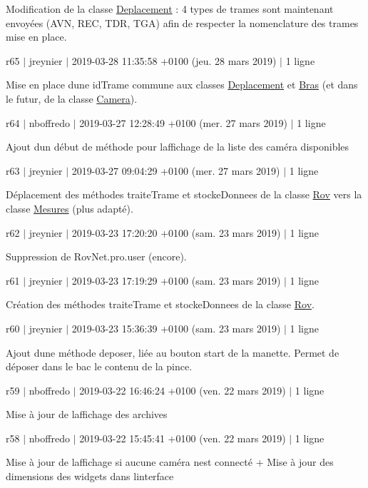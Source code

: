 Modification de la classe \hyperlink{class_deplacement}{Deplacement} \+: 4 types de trames sont maintenant envoyées (A\+VN, R\+EC, T\+DR, T\+GA) afin de respecter la nomenclature des trames mise en place.

r65 $\vert$ jreynier $\vert$ 2019-\/03-\/28 11\+:35\+:58 +0100 (jeu. 28 mars 2019) $\vert$ 1 ligne

Mise en place d\textquotesingle{}une id\+Trame commune aux classes \hyperlink{class_deplacement}{Deplacement} et \hyperlink{class_bras}{Bras} (et dans le futur, de la classe \hyperlink{class_camera}{Camera}).

r64 $\vert$ nboffredo $\vert$ 2019-\/03-\/27 12\+:28\+:49 +0100 (mer. 27 mars 2019) $\vert$ 1 ligne

Ajout d\textquotesingle{}un début de méthode pour l\textquotesingle{}affichage de la liste des caméra disponibles

r63 $\vert$ jreynier $\vert$ 2019-\/03-\/27 09\+:04\+:29 +0100 (mer. 27 mars 2019) $\vert$ 1 ligne

Déplacement des méthodes traite\+Trame et stocke\+Donnees de la classe \hyperlink{class_rov}{Rov} vers la classe \hyperlink{class_mesures}{Mesures} (plus adapté).

r62 $\vert$ jreynier $\vert$ 2019-\/03-\/23 17\+:20\+:20 +0100 (sam. 23 mars 2019) $\vert$ 1 ligne

Suppression de Rov\+Net.\+pro.\+user (encore).

r61 $\vert$ jreynier $\vert$ 2019-\/03-\/23 17\+:19\+:29 +0100 (sam. 23 mars 2019) $\vert$ 1 ligne

Création des méthodes traite\+Trame et stocke\+Donnees de la classe \hyperlink{class_rov}{Rov}.

r60 $\vert$ jreynier $\vert$ 2019-\/03-\/23 15\+:36\+:39 +0100 (sam. 23 mars 2019) $\vert$ 1 ligne

Ajout d\textquotesingle{}une méthode deposer, liée au bouton start de la manette. Permet de déposer dans le bac le contenu de la pince.

r59 $\vert$ nboffredo $\vert$ 2019-\/03-\/22 16\+:46\+:24 +0100 (ven. 22 mars 2019) $\vert$ 1 ligne

Mise à jour de l\textquotesingle{}affichage des archives

r58 $\vert$ nboffredo $\vert$ 2019-\/03-\/22 15\+:45\+:41 +0100 (ven. 22 mars 2019) $\vert$ 1 ligne

Mise à jour de l\textquotesingle{}affichage si aucune caméra n\textquotesingle{}est connecté + Mise à jour des dimensions des widgets dans l\textquotesingle{}interface

